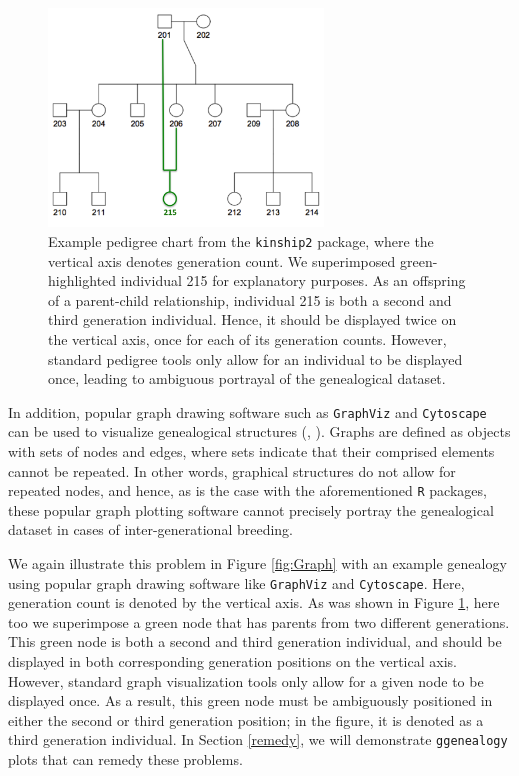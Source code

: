 \documentclass[11pt,a4paper,oldfontcommands,openany]{memoir}
\numberwithin{equation}{section} %
\newcommand{\pkg}[1]{{\texttt{#1}}}
\begin{document}
\begin{figure}[H]
    \centering
    \includegraphics[width=0.65\textwidth]{kinshipFig}
    \caption{Example pedigree chart from the \pkg{kinship2} package, where the vertical axis denotes generation count. We superimposed green-highlighted individual 215 for explanatory purposes. As an offspring of a parent-child relationship, individual 215 is both a second and third generation individual. Hence, it should be displayed twice on the vertical axis, once for each of its generation counts. However, standard pedigree tools only allow for an individual to be displayed once, leading to ambiguous portrayal of the genealogical dataset.}
    \label{fig:kinshipFig}
\end{figure}

In addition, popular graph drawing software such as \pkg{GraphViz} and \pkg{Cytoscape} can be used to visualize genealogical structures (\citealt{graphvizCit}, \citealt{cytoscapeCit}). Graphs are defined as objects with sets of nodes and edges, where sets indicate that their comprised elements cannot be repeated. In other words, graphical structures do not allow for repeated nodes, and hence, as is the case with the aforementioned \pkg{R} packages, these popular graph plotting software cannot precisely portray the genealogical dataset in cases of inter-generational breeding.

We again illustrate this problem in Figure \ref{fig:Graph} with an example genealogy using popular graph drawing software like \pkg{GraphViz} and \pkg{Cytoscape}. Here, generation count is denoted by the vertical axis. As was shown in Figure \ref{fig:kinshipFig}, here too we superimpose a green node that has parents from two different generations. This green node is both a second and third generation individual, and should be displayed in both corresponding generation positions on the vertical axis. However, standard graph visualization tools only allow for a given node to be displayed once. As a result, this green node must be ambiguously positioned in either the second or third generation position; in the figure, it is denoted as a third generation individual. In Section \ref{remedy}, we will demonstrate \pkg{ggenealogy} plots that can remedy these problems.
\end{document}
